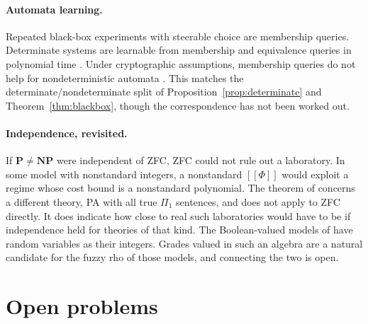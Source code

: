 \documentclass[11pt]{article}
\theoremstyle{definition}
\theoremstyle{plain}
\theoremstyle{remark}
\newcommand{\enc}[1]{[\![#1]\!]}
\newcommand{\Pclass}{\mathbf{P}}
\newcommand{\NPclass}{\mathbf{NP}}
\begin{document}
\paragraph{Automata learning.} Repeated black-box experiments with
steerable choice are membership queries. Determinate systems are
learnable from membership and equivalence queries in polynomial time
\cite{Angluin87}. Under cryptographic assumptions, membership queries do
not help for nondeterministic automata \cite{AngluinKharitonov95}. This
matches the determinate/nondeterminate split of
Proposition~\ref{prop:determinate} and Theorem~\ref{thm:blackbox}, though
the correspondence has not been worked out.

\paragraph{Independence, revisited.} If $\Pclass \neq \NPclass$ were
independent of ZFC, ZFC could not rule out a laboratory. In some model
with nonstandard integers, a nonstandard $\enc{\Phi}$ would exploit a
regime whose cost bound is a nonstandard polynomial. The theorem of
\cite{BenDavidHalevi92} concerns a different theory, PA with all true
$\Pi_1$ sentences, and does not apply to ZFC directly. It does indicate
how close to real such laboratories would have to be if independence held
for theories of that kind. The
Boolean-valued models of \cite{Krajicek11} have random variables as
their integers. Grades valued in such an algebra are a natural candidate
for the fuzzy rho of those models, and connecting the two is open.

\section{Open problems}\label{sec:open}
\end{document}

